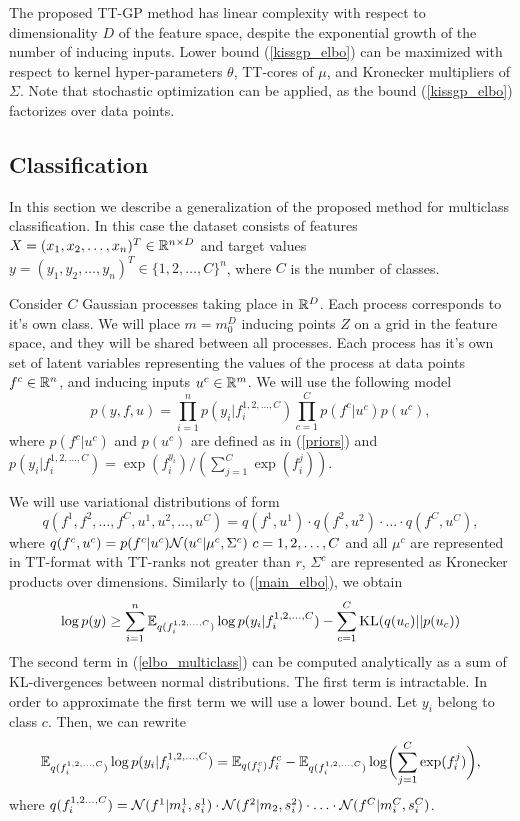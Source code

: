   The proposed TT-GP method has linear complexity with respect to dimensionality
  $D$ of the feature space, despite the exponential growth of the number of
  inducing inputs. Lower bound  (\ref{kissgp_elbo})
  can be maximized with respect to kernel hyper-parameters $\theta$, TT-cores
  of $\mu$, and Kronecker multipliers of $\Sigma$. Note that stochastic optimization
  can be applied, as the bound (\ref{kissgp_elbo}) factorizes over data points.

\subsection{Classification}

  In this section we describe a generalization of the proposed method for
  multiclass classification. In this case the dataset consists of features
  $X = (x_1, x_2, \ldots, x_n)^T \in \mathbb{R}^{n \times D}$ and target values
  $y = (y_1, y_2, \ldots, y_n)^T \in \{1, 2, \ldots, C\}^n$, where $C$ is the
  number of classes.

  Consider $C$ Gaussian processes taking place in $\mathbb{R}^D$. Each process
  corresponds to it's own class. We will place $m = m_0^D$ inducing points $Z$ on a grid
  in the feature space, and they will be shared between all processes. Each
  process has it's own set of latent variables representing the values of
  the process at data points $f^c \in \mathbb{R}^n$, and inducing inputs $u^c \in \mathbb{R}^m$.
  We will use the following model
  \[
    p(y, f, u) = \prod_{i=1}^n p(y_i | f_i^{1, 2, \ldots, C})
      \prod_{c=1}^C p(f^c | u^c) p(u^c),
  \]
  where $p(f^c | u^c)$ and $p(u^c)$ are defined as in (\ref{priors}) and $p(y_i | f_i^{1,2, \ldots, C}) = \exp(f_i^{y_i}) / (\sum_{j=1}^C\exp(f_i^j))$.
  
  We will use variational distributions of form
  \[
    q(f^1, f^2, \ldots, f^C, u^1, u^2, \ldots, u^C) =
    q(f^1, u^1) \cdot q(f^2, u^2) \cdot \ldots \cdot q(f^C, u^C),
  \]
  where $q(f^c, u^c) = p(f^c | u^c) \mathcal{N}(u^c | \mu^c, \Sigma^c)\ c=1, 2, \ldots, C$ and all $\mu^c$ are represented in TT-format with TT-ranks not greater than $r$,
  $\Sigma^c$ are represented as Kronecker products over dimensions. Similarly to (\ref{main_elbo}), we obtain
  \begin{equation}
  \label{elbo_multiclass}
    \log p(y) \ge \sum_{i = 1}^n \mathbb{E}_{q(f_i^{1, 2, \ldots, C})} \log p(y_i | f_i^{1, 2, \ldots, C})
      - \sum_{c = 1}^{C} \mbox{KL}(q(u_c) || p(u_c))
  \end{equation}
  The second term in (\ref{elbo_multiclass}) can be computed analytically as
  a sum of KL-divergences between normal distributions. The first term is
  intractable. In order to approximate the first term we will use a lower bound.
  Let $y_i$ belong to class $c$. Then, we can rewrite
  \begin{equation}
  \label{expectation_term}
    \mathbb{E}_{q(f_i^{1, 2, \ldots, C})} \log p(y_i | f_i^{1, 2, \ldots, C}) =
    \mathbb{E}_{q(f_i^c)} f_i^c - \mathbb{E}_{q(f_i^{1, 2, \ldots, C})}
    \log \biggl(\sum_{j=1}^C \exp (f_i^j) \biggr),
  \end{equation}
  where $q(f_i^{1, 2\ldots, C}) = \mathcal{N}(f^1 | m_i^1, s_i^1)\cdot \mathcal{N}(f^2| m_2, s_i^2) \cdot \ldots \cdot \mathcal{N}(f^C | m_i^C, s_i^C)$.

